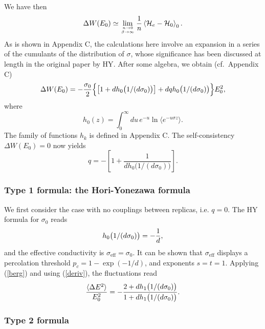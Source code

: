 We have then
\begin{equation}
\label{dwsa}
\Delta W(E_0)\simeq\lim_{n\to 0\atop \beta\to\infty}\frac{1}{n}
\left\langle
{\cal{H}}_e-{\cal{H}}_0\right\rangle_0.
\end{equation}
As is shown in Appendix C, the calculations here involve an expansion
in a series of the cumulants of the distribution of $\sigma$, whose
significance has been discussed at length in the original paper by
HY\cite{HORI77}. After some algebra, we obtain (cf.\ Appendix C)
\begin{equation}
\label{fmfodeu}
\Delta W(E_0)
=-{\sigma_0\over 2}\Bigl\{\left[1+d h_0 \bigl(1/(d\sigma_0)\bigr)\right]+d q h_0
\bigl(1/(d\sigma_0)\bigr)\Bigr\}E_0^2,
\end{equation}
where
\begin{equation}
h_0(z)=\int_0^{\infty}du\, e^{-u}\ln\langle e^{-u\sigma z}\rangle.
\end{equation}
The family of functions $h_k$ is defined in Appendix C.
The self-consistency $\Delta W(E_0)=0$ now yields
\begin{equation}
\label{q}
q=-\left[1+\frac{1}{d h_0 \bigl(1/(d\sigma_0)\bigr)}\right].
\end{equation}

\subsubsection{Type 1 formula: the Hori-Yonezawa formula}
\label{thfr}

We first consider the case with no couplings between replicas,
i.e. $q=0$. The HY formula for $\sigma_0$ reads
\begin{equation}
\label{hy}
h_0 \bigl(1/(d\sigma_0)\bigr)=-{1\over d},
\end{equation}
and the effective conductivity is $\sigma_{\text{eff}}=\sigma_0$.
It can be shown that $\sigma_{\text{eff}}$ displays a percolation
threshold
$p_c=1-\exp(-1/d)$, and exponents $s=t=1$\cite{HORI77}.
Applying (\ref{berg}) and using (\ref{deriv}), the fluctuations read
\begin{equation}
\frac{\langle\Delta E^2\rangle}{E_0^2}=
-{2 +d h_1\bigl(1/(d\sigma_0)\bigr)\over 1+d h_1\bigl(1/(d\sigma_0)\bigr)}.
\end{equation}

\subsubsection{Type 2 formula}
\label{nef}

